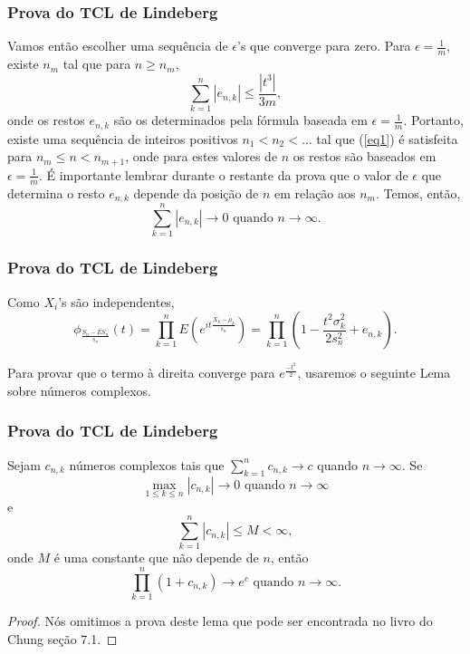 \begin{frame}
\frametitle{\textbf{Prova do TCL de Lindeberg}}
\baselineskip=13pt
\begin{block}{}


Vamos então escolher uma sequência de $\epsilon$'s  que converge
para zero. Para $\epsilon=\frac{1}{m}$, existe $n_m$ tal que para
$n\geq n_m$,
\begin{equation}\label{eq1}\sum_{k=1}^{n}|e_{n,k}|\leq
\frac{|t^3|}{3m},
\end{equation}
onde os restos $e_{n,k}$ são os determinados pela fórmula baseada em
$\epsilon=\frac{1}{m}$. Portanto, existe uma sequência de inteiros
positivos $n_1<n_2<\ldots$ tal que (\ref{eq1}) é satisfeita para
$n_m\leq n<n_{m+1}$, onde para estes valores de $n$ os restos são
baseados em $\epsilon=\frac{1}{m}$. É importante lembrar durante o
restante da prova que o valor de $\epsilon$ que determina o resto
$e_{n,k}$ depende da posição de $n$ em relação aos $n_m$. Temos,
então,
$$\sum_{k=1}^{n}|e_{n,k}|\rightarrow 0\mbox{ quando }n\rightarrow \infty.$$

\end{block}
\end{frame}

\begin{frame}
\frametitle{\textbf{Prova do TCL de Lindeberg}}
\baselineskip=13pt
\begin{block}{}


Como $X_i$'s são independentes,
$$\phi_{\frac{S_n-ES_n}{s_n}}(t)=\prod_{k=1}^{n}E(e^{it\frac{X_k-\mu_k}{s_n}})=\prod_{k=1}^{n}(1-\frac{t^2\sigma_k^2}{2s_n^2}+e_{n,k}).$$

Para provar que o termo à direita converge para
$e^{\frac{-t^2}{2}}$, usaremos o seguinte Lema sobre números
complexos.

\end{block}
\end{frame}

\begin{frame}
\frametitle{\textbf{Prova do TCL de Lindeberg}}


\begin{lema}
Sejam $c_{n,k}$ números complexos tais que
$\sum_{k=1}^{n}c_{n,k}\rightarrow c$ quando $n\rightarrow\infty$. Se
$$\max_{1\leq k\leq n}|c_{n,k}|\rightarrow 0\mbox{ quando }n\rightarrow\infty$$
e
$$\sum_{k=1}^{n}|c_{n,k}|\leq M<\infty,$$
onde $M$ é uma constante que não depende de $n$, então
$$\prod_{k=1}^{n}(1+c_{n,k})\rightarrow e^c\mbox{ quando }n\rightarrow\infty.$$
\end{lema}

\begin{proof} Nós omitimos a prova deste lema que pode ser encontrada no
livro do Chung seção 7.1. \end{proof}


\end{frame}

